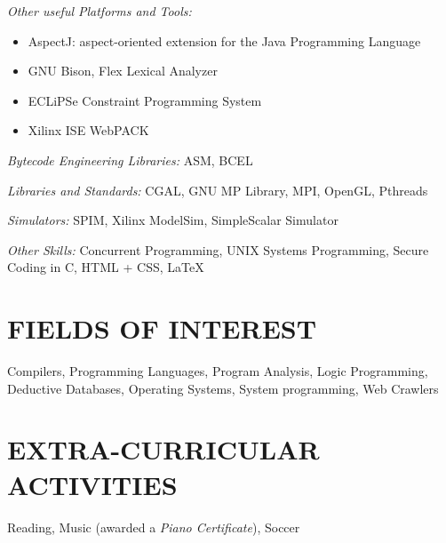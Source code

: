 \documentclass[margin]{res}
\begin{document}
\begin{resume}
        {\sl Other useful Platforms and Tools:}
        \begin{itemize}
        \item AspectJ: aspect-oriented extension for the Java Programming Language
        \item GNU Bison, Flex Lexical Analyzer
        \item ECLiPSe Constraint Programming System
        \item Xilinx ISE WebPACK
        \end{itemize}

        {\sl Bytecode Engineering Libraries:}
        ASM, BCEL

        {\sl Libraries and Standards:}
        CGAL, GNU MP Library, MPI, OpenGL, Pthreads

        {\sl Simulators:}
        SPIM, Xilinx ModelSim, SimpleScalar Simulator

        {\sl Other Skills:}
        Concurrent Programming, UNIX Systems Programming, Secure Coding in C, HTML + CSS, \LaTeX

\section{FIELDS OF INTEREST} Compilers, Programming Languages, Program Analysis, Logic Programming, \\ 
Deductive Databases, Operating Systems, System programming, Web Crawlers

\section{EXTRA-CURRICULAR \\ ACTIVITIES}             
Reading, Music (awarded a {\it Piano Certificate}), Soccer

\end{resume}
\end{document}
